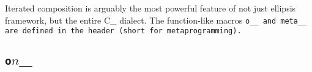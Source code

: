 Iterated composition is arguably the most powerful feature
of not just ellipsis framework, but the entire C\_ dialect.
The function-like macros \tt{o__} and \tt{meta__} are defined
in the header  (short for metaprogramming).

\subsection{}


\subsection{}


\subsection{\tt{o}$n$\_\_}

